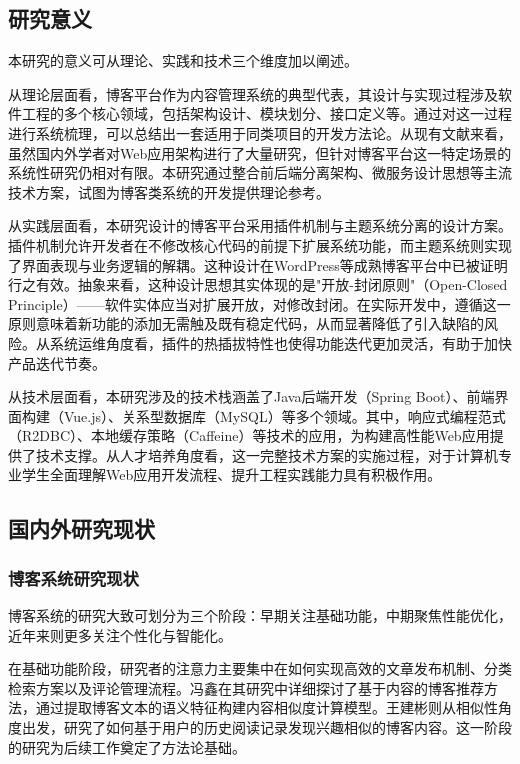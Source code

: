 \documentclass[UTF8,AutoFakeBold=1,AutoFakeSlant,zihao=-4]{SCAU}
\begin{document}
 \subsection{研究意义}

 本研究的意义可从理论、实践和技术三个维度加以阐述。

 从理论层面看，博客平台作为内容管理系统的典型代表，其设计与实现过程涉及软件工程的多个核心领域，包括架构设计、模块划分、接口定义等。通过对这一过程进行系统梳理，可以总结出一套适用于同类项目的开发方法论。从现有文献来看，虽然国内外学者对Web应用架构进行了大量研究，但针对博客平台这一特定场景的系统性研究仍相对有限。本研究通过整合前后端分离架构、微服务设计思想等主流技术方案，试图为博客类系统的开发提供理论参考。

 从实践层面看，本研究设计的博客平台采用插件机制与主题系统分离的设计方案。插件机制允许开发者在不修改核心代码的前提下扩展系统功能，而主题系统则实现了界面表现与业务逻辑的解耦。这种设计在WordPress等成熟博客平台中已被证明行之有效。抽象来看，这种设计思想其实体现的是"开放-封闭原则"（Open-Closed Principle）——软件实体应当对扩展开放，对修改封闭。在实际开发中，遵循这一原则意味着新功能的添加无需触及既有稳定代码，从而显著降低了引入缺陷的风险。从系统运维角度看，插件的热插拔特性也使得功能迭代更加灵活，有助于加快产品迭代节奏。

 从技术层面看，本研究涉及的技术栈涵盖了Java后端开发（Spring Boot）、前端界面构建（Vue.js）、关系型数据库（MySQL）等多个领域。其中，响应式编程范式（R2DBC）、本地缓存策略（Caffeine）等技术的应用，为构建高性能Web应用提供了技术支撑。从人才培养角度看，这一完整技术方案的实施过程，对于计算机专业学生全面理解Web应用开发流程、提升工程实践能力具有积极作用。

 \subsection{国内外研究现状}

 \subsubsection{博客系统研究现状}

 博客系统的研究大致可划分为三个阶段：早期关注基础功能，中期聚焦性能优化，近年来则更多关注个性化与智能化。

 在基础功能阶段，研究者的注意力主要集中在如何实现高效的文章发布机制、分类检索方案以及评论管理流程。冯鑫{\citep{冯鑫2012}}在其研究中详细探讨了基于内容的博客推荐方法，通过提取博客文本的语义特征构建内容相似度计算模型。王建彬{\citep{王建彬2012}}则从相似性角度出发，研究了如何基于用户的历史阅读记录发现兴趣相似的博客内容。这一阶段的研究为后续工作奠定了方法论基础。
\end{document}
